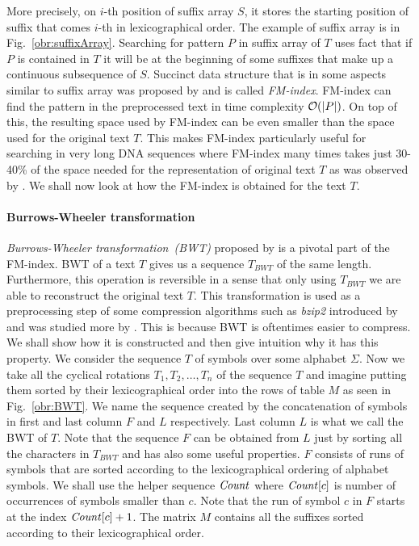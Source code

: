 More precisely, on $i$-th position of suffix array $S$, it stores the starting position of
suffix that comes $i$-th in lexicographical order. The example of suffix array is in
Fig.~\ref{obr:suffixArray}. Searching for pattern $P$ in suffix array of $T$ uses fact that
if $P$ is contained in $T$ it will be at the beginning of some suffixes that make up a
continuous subsequence of $S$. Succinct data structure that is in some aspects similar to
suffix array was proposed by \cite{ferragina2000opportunistic} and is called \textit{FM-index}.
FM-index can find the pattern in the preprocessed text in time complexity $\mathcal{O}(|P|)$. On top
of this, the resulting space used by FM-index can be even smaller than the space used for the original
text $T$. This makes FM-index particularly useful for searching in very long DNA sequences where
FM-index many times takes just 30-40\% of the space needed for the representation of original text
$T$ as was observed by \cite{ferragina2001experimental}. We shall now look at how the FM-index
is obtained for the text $T$.

\paragraph{Burrows-Wheeler transformation}

\textit{Burrows-Wheeler transformation~(BWT)} proposed by \cite{burrows1994block} is a pivotal
part of the FM-index. BWT of a text $T$ gives us a sequence $\mathit{T_{BWT}}$ of the same
length. Furthermore, this operation is reversible in a sense that only using $\mathit{T_{BWT}}$
we are able to reconstruct the original text $T$. This transformation is used as a
preprocessing step of some compression algorithms such as \textit{bzip2} introduced by
\cite{seward1996bzip2} and was studied more by \cite{manzini2001analysis}. This is because
BWT is oftentimes easier to compress. We shall show how it is constructed and then give 
intuition why it has this property. We consider the sequence $T$ of symbols over some
alphabet $\Sigma$. Now we take all the cyclical rotations $T_1, T_2, \ldots ,T_n$ of
the sequence $T$ and imagine putting them sorted by their lexicographical order into the
rows of table $M$ as seen in Fig.~\ref{obr:BWT}. We name the sequence created by the
concatenation of symbols in first and last column $F$ and $L$ respectively. Last column $L$
is what we call the BWT of $T$. Note that the sequence $F$ can be obtained from $L$ just by
sorting all the characters in $\mathit{T_{BWT}}$ and has also some useful properties. $F$ consists
of runs of symbols that are sorted according to the lexicographical ordering of alphabet symbols.
We shall use the helper sequence $\mathit{Count}$ where $\mathit{Count}[c]$ is number of occurrences of symbols
smaller than $c$. Note that the run of symbol $c$ in $F$ starts at the index $\mathit{Count}[c]+1$. The
matrix $M$ contains all the suffixes sorted according to their lexicographical order.

